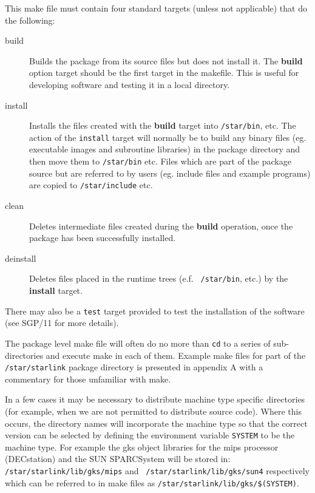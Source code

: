 This make file must contain four standard targets (unless not applicable)
that do the following:
\begin{description}

\item[build] Builds the package from its source files but does not install it.
The {\bf build} option target should be the first target in the makefile.
This is useful for developing software and testing it in a local directory.

\item[install] Installs the files created with the {\bf build} target
into {\tt /star/bin}, etc.
The action of the {\tt install} target will normally be to build any binary
files (eg. executable images and subroutine libraries) in the package directory
and then move them to {\tt /star/bin} etc. Files which are part of the package
source but are referred to by users (eg. include files and example programs) are
copied to {\tt /star/include} etc.

\item[clean] Deletes intermediate files created during the {\bf build}
operation, once the package has been successfully installed.

\item[deinstall] Deletes files placed in the runtime trees (e.f. {\tt
/star/bin}, etc.) by the {\bf install} target.


\end{description}


There may also be a {\tt test} target provided to test the installation of the
software (see SGP/11 for more details).


The package level make file will often do no more than {\tt cd} to a series
of sub-directories and execute make in each of them.
Example make files for part of the {\tt /star/starlink} package
directory is presented in appendix A with a commentary for those unfamiliar 
with make.

In a few cases it may be necessary to distribute machine type specific 
directories (for example, when we are not permitted to distribute source code). 
Where this occurs, the directory names will incorporate the machine type so
that the correct version can be selected by defining the environment variable
{\tt SYSTEM} to be the machine type.
For example the gks object libraries for the
mips processor (DECstation) and the SUN SPARCSystem will be stored in:
{\tt /star\-/starlink\-/lib\-/gks\-/mips} and {\tt 
/star\-/starlink\-/lib\-/gks\-/sun4} respectively which can be referred to 
in make files as {\tt /star\-/starlink\-/lib\-/gks\-/\$(SYSTEM)}.


